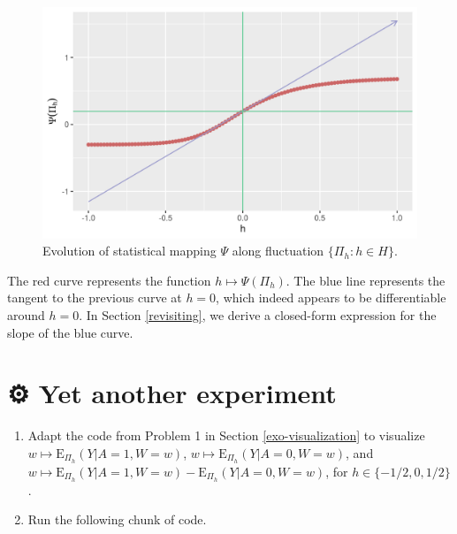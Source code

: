 \documentclass[11pt,openright,twoside]{book}
\newcommand{\gear}{\usebox{\gearbox}\;}
\newcommand{\Exp}{\textrm{E}}
\theoremstyle{definition}
\theoremstyle{definition}
\theoremstyle{definition}
\theoremstyle{remark}
\begin{document}
\begin{figure}

{\centering \includegraphics[width=0.7\linewidth]{img/psi-approx-psi-one-1} 

}

\caption{Evolution of statistical mapping \(\Psi\) along fluctuation \(\{\Pi_{h} : h \in H\}\).}\label{fig:psi-approx-psi-one}
\end{figure}

The red curve represents the function \(h \mapsto \Psi(\Pi_{h})\). The blue line
represents the tangent to the previous curve at \(h=0\), which indeed appears to
be differentiable around \(h=0\). In Section \ref{revisiting}, we derive a
closed-form expression for the slope of the blue curve.

\hypertarget{exo-yet-another-experiment}{%
\section{\texorpdfstring{⚙ \gear Yet another experiment}{⚙ Yet another experiment}}\label{exo-yet-another-experiment}}

\begin{enumerate}
\def\labelenumi{\arabic{enumi}.}
\item
  Adapt the code from Problem 1 in Section \ref{exo-visualization} to
  visualize \(w \mapsto \Exp_{\Pi_h}(Y | A = 1, W = w)\), \(w \mapsto \Exp_{\Pi_h}(Y | A = 0, W=w)\), and \(w \mapsto \Exp_{\Pi_h}(Y | A = 1, W=w) - \Exp_{\Pi_h}(Y | A = 0, W=w)\), for \(h \in \{-1/2, 0, 1/2\}\).
\item
  Run the following chunk of code.
\end{enumerate}
\end{document}
